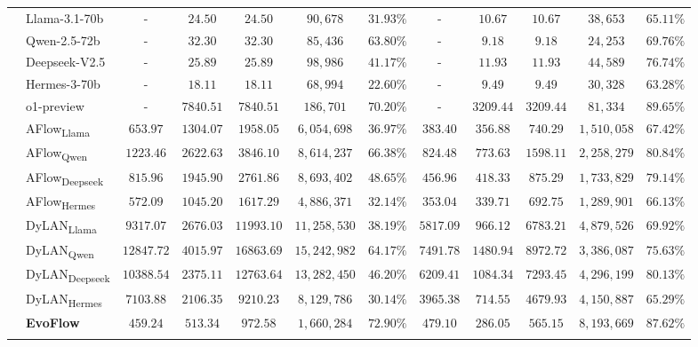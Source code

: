 \documentclass{article}
\theoremstyle{plain}
\theoremstyle{definition}
\theoremstyle{remark}
\newcommand{\ourmethod}{{\fontfamily{lmtt}\selectfont \textbf{EvoFlow}}\xspace}
\begin{document}
\begin{table}[!t]
{\begin{tabular}{llcccccccccc}
\hline
\parbox[t]{2mm}{} & Llama-3.1-70b & - & $24.50$ & $24.50$ & $90,678$ & $31.93\%$ & - & $10.67$ & $10.67$ & $38,653$ & $65.11\%$  \\
 & Qwen-2.5-72b & - & $32.30$ & $32.30$ & $85,436$ & $63.80\%$ & - & $9.18$ & $9.18$ & $24,253$ & $69.76\%$\\
 & Deepseek-V2.5 & - & $25.89$  & $25.89$  & $98,986$ & $41.17\%$ & - & $11.93$ & $11.93$ & $44,589$ & $76.74\%$    \\
  & Hermes-3-70b  & - & $18.11$ & $18.11$ &  $68,994$ & $22.60\%$ & - & $9.49$ & $9.49$ & $30,328$ & $63.28\%$  \\
  \cmidrule(lr){2-12}
   & o1-preview  & - & $7840.51$ & $7840.51$ & $186,701$ & $70.20\%$ & - &$3209.44$ & $3209.44$ & $81,334$ & $89.65\%$ \\
  \hline
  \parbox[t]{2mm}{} & AFlow\textsubscript{Llama} & $653.97$ & $1304.07$ & $1958.05$ & $6,054,698$ & $36.97\%$ & $383.40$ & $356.88$ & $740.29$ & $1,510,058$ & $67.42\%$\\
 & AFlow\textsubscript{Qwen} &  $1223.46$ & $2622.63$ & $3846.10$ & $8,614,237$ & $66.38\%$ & $824.48$ & $773.63$ & $1598.11$ & $2,258,279$ & $80.84\%$ \\
 & AFlow\textsubscript{Deepseek} & $815.96$ & $1945.90$ & $2761.86$ & $8,693,402$ &  $48.65\%$ & $456.96$ & $418.33$ & $875.29$ & $1,733,829$ & $79.14\%$  \\
  & {AFlow\textsubscript{Hermes}} & $572.09$ & $1045.20$ & $1617.29$ & $4,886,371$ & $32.14\%$ & $353.04$ & $339.71$ & $692.75$ & $1,289,901$ & $66.13\%$ \\
  \cmidrule(lr){2-12}
  & DyLAN\textsubscript{Llama} & $9317.07$ & $2676.03$ & $11993.10$ & $11,258,530$ & $38.19\%$ & $5817.09$ & $966.12$ & $6783.21$ & $4,879,526$ & $69.92\%$ \\
   & DyLAN\textsubscript{Qwen} & $12847.72$ & $4015.97$ & $16863.69$ & $15,242,982$ & $64.17\%$ & $7491.78$ & $1480.94$ & $8972.72$ & $3,386,087$ & $75.63\%$\\
 & DyLAN\textsubscript{Deepseek}  & $10388.54$ & $2375.11$ &  $12763.64$ & $13,282,450$ & $46.20\%$ & $6209.41$ & $1084.34$ & $7293.45$ & $4,296,199$ & $80.13\%$\\
  & DyLAN\textsubscript{Hermes} & $7103.88$ & $2106.35$ & $9210.23$ & $8,129,786$  & $30.14\%$ & $3965.38$ & $714.55$ & $4679.93$ & $4,150,887$ & $65.29\%$\\
  \hline
  & \ourmethod & $459.24$ & $513.34$ & $972.58$ & $1,660,284$ & $72.90\%$ & $479.10$ & $286.05$ & $565.15$ &  $8,193,669$ & $87.62\%$ \\
 
 


\Xhline{1.2pt}
\end{tabular}}\label{tab:heterogeneous}
\vspace{-1.3em}
\end{table}
\end{document}
